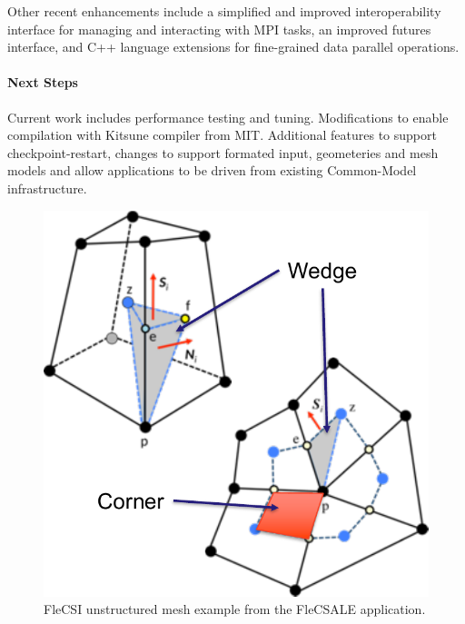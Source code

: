 Other recent enhancements include a simplified and improved
interoperability interface for managing and interacting with MPI tasks,
an improved futures interface, and C++ language extensions for
fine-grained data parallel operations.

\paragraph{Next Steps}

Current work includes performance testing and tuning. Modifications 
to enable compilation with Kitsune compiler from MIT. Additional 
features to support checkpoint-restart, changes to support formated 
input, geometeries and mesh models and allow applications to be driven 
from existing Common-Model infrastructure.

\begin{figure}
  \centering
  \includegraphics[scale=0.6]{projects/2.3.6-NNSA/2.3.6.01-LANL-ATDM/mesh.pdf}
  \caption{FleCSI unstructured mesh example from the FleCSALE application.}
  \label{fig:mesh}
\end{figure}
